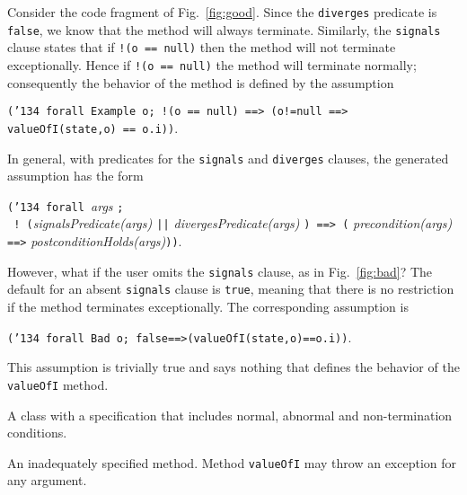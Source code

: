 \documentclass{sig-alternate2}
\begin{document}
Consider the code fragment of Fig.~\ref{fig:good}.   Since the \texttt{diverges} predicate is \texttt{false},
we know that the method will always terminate.  Similarly, the \texttt{signals} clause states that
if \texttt{!(o == null)} then the method
will not terminate exceptionally.  Hence if \texttt{!(o == null)} the method will terminate
normally; consequently the behavior of the method is defined by the assumption
\begin{center}\texttt{(\char'134 forall Example o; !(o == null) ==> (o!=null ==> valueOfI(state,o) == o.i))}.\end{center}
In general, with predicates for the \texttt{signals} and \texttt{diverges} clauses, the 
generated assumption has the form
\begin{center} \texttt{(\char'134 forall }{\em args} \texttt{; }\\ \texttt{ ! (}{\em signalsPredicate(args) {\tt ||} divergesPredicate(args) }\texttt{) ==> (} {\em precondition(args)} {\tt ==>} {\em postconditionHolds(args)}\texttt{))}.\end{center}

However, what if the user omits the \texttt{signals} clause, as in Fig.~\ref{fig:bad}?  The default for an
absent \texttt{signals} clause is \texttt{true}, meaning that there is no restriction if the method
terminates exceptionally.  The corresponding assumption is 
\begin{center}{ \texttt{(\char'134 forall Bad o; false==>(valueOfI(state,o)==o.i))}}.\end{center}
This assumption is trivially true and says nothing that defines the behavior of the \texttt{valueOfI}
method.   


\begin{BFIGURE}

\caption{A class with a specification that includes normal, abnormal and non-termination conditions.}
\label{fig:good}
\end{BFIGURE}

\begin{BFIGURE}

\caption{An inadequately specified method.  Method \texttt{valueOfI} may throw an 
exception for any argument.}
\label{fig:bad}
\end{BFIGURE}
\end{document}

